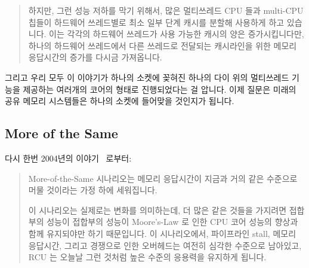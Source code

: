 \begin{quote}
	하지만, 그런 성능 저하를 막기 위해서, 많은 멀티쓰레드 CPU 들과
	multi-CPU 칩들이 하드웨어 쓰레드별로 최소 일부 단계 캐시를 분할해
	사용하게 하고 있습니다.
	이는 각각의 하드웨어 쓰레드가 사용 가능한 캐시의 양은 증가시킵니다만,
	하나의 하드웨어 쓰레드에서 다른 쓰레드로 전달되는 캐시라인을 위한
	메모리 응답시간의 증가를 다시금 가져옵니다.

\end{quote}

그리고 우리 모두 이 이야기가 하나의 소켓에 꽂혀진 하나의 다이 위의 멀티쓰레드
기능을 제공하는 여러개의 코어의 형태로 진행되었다는 걸 압니다.
이제 질문은 미래의 공유 메모리 시스템들은 하나의 소켓에 들어맞을 것인지가
됩니다.

\subsection{More of the Same}
\label{sec:meas:More of the Same}

다시 한번 2004년의 이야기~\cite{PaulEdwardMcKenneyPhD} 로부터:

\begin{quote}
	More-of-the-Same 시나리오는 메모리 응답시간이 지금과 거의 같은
	수준으로 머물 것이라는 가정 하에 세워집니다.

	이 시나리오는 실제로는 변화를 의미하는데, 더 많은 같은 것들을 가지려면
	접합부의 성능이 접합부의 성능이 Moore's-Law 로 인한 CPU 코어 성능의
	향상과 함께 유지되야만 하기 때문입니다.
	이 시나리오에서, 파이프라인 stall, 메모리 응답시간, 그리고 경쟁으로
	인한 오버헤드는 여전히 심각한 수준으로 남아있고, RCU 는 오늘날 그런
	것처럼 높은 수준의 응용력을 유지하게 됩니다.

\end{quote}

